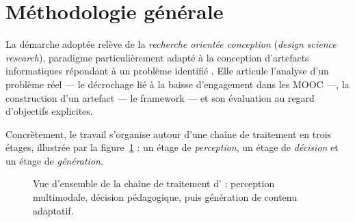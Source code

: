 \section{Méthodologie générale}
\label{sec:methodologie}

La démarche adoptée relève de la \emph{recherche orientée conception}
(\emph{design science research}), paradigme particulièrement adapté à la
conception d'artefacts informatiques répondant à un problème identifié
\cite{hevner2004design}. Elle articule l'analyse d'un problème réel — le
décrochage lié à la baisse d'engagement dans les MOOC —, la construction d'un
artefact — le framework \emolearn{} — et son évaluation au regard d'objectifs
explicites.

Concrètement, le travail s'organise autour d'une chaîne de traitement en trois
étages, illustrée par la figure~\ref{fig:pipeline} : un étage de
\emph{perception}, un étage de \emph{décision} et un étage de \emph{génération}.

\begin{figure}[H]
\centering
{}
\caption{Vue d'ensemble de la chaîne de traitement d'\emolearn{} :
perception multimodale, décision pédagogique, puis génération de contenu
adaptatif.}
\label{fig:pipeline}
\end{figure}

